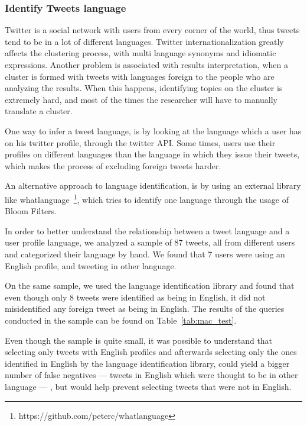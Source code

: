\documentclass[journal]{IEEEtran}
\begin{document}
\subsubsection{Identify Tweets language}
\label{ssub:identify_tweets_lang}
Twitter is a social network with users from every corner of the world, thus tweets tend to be in a lot of different languages. Twitter internationalization greatly affects the clustering process, with multi language synonyms and idiomatic expressions. Another problem is associated with results interpretation, when a cluster is formed with tweets with languages foreign to the people who are analyzing the results. When this happens, identifying topics on the cluster is extremely hard, and most of the times the researcher will have to manually translate a cluster.  

One way to infer a tweet language, is by looking at the language which a user has on his twitter profile, through the twitter API. Some times, users use their profiles on different languages than the language in which they issue their tweets, which makes the process of excluding foreign tweets harder.

An alternative approach to language identification, is by using an external library like whatlanguage~\footnote{https://github.com/peterc/whatlanguage}, which tries to identify one language through the usage of Bloom Filters.  

In order to better understand the relationship between a tweet language and a user profile language, we analyzed a sample of 87 tweets, all from different users and categorized their language by hand. We found that 7 users were using an English profile, and tweeting in other language.

On the same sample, we used the language identification library and found that even though only 8 tweets were identified as being in English, it did not misidentified any foreign tweet as being in English. The results of the queries conducted in the sample can be found on Table~\ref{tab:mac_test}.  



Even though the sample is quite small, it was possible to understand that selecting only tweets with English profiles and afterwards selecting only the ones identified in English by the language identification library, could yield a bigger number of false negatives --- tweets in English which were thought to be in other language ---  , but would help prevent selecting tweets that were not in English.
 
\end{document}
